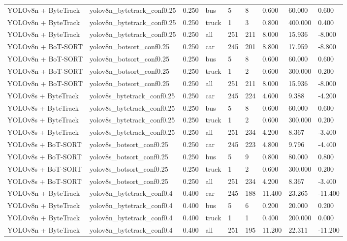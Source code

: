\begin{tabular}{lllllllll}
YOLOv8n + ByteTrack & yolov8n\_bytetrack\_conf0.25 & 0.250 & bus & 5 & 8 & 0.600 & 60.000 & 0.600 \\
YOLOv8n + ByteTrack & yolov8n\_bytetrack\_conf0.25 & 0.250 & truck & 1 & 3 & 0.800 & 400.000 & 0.400 \\
YOLOv8n + ByteTrack & yolov8n\_bytetrack\_conf0.25 & 0.250 & all & 251 & 211 & 8.000 & 15.936 & -8.000 \\
YOLOv8n + BoT-SORT & yolov8n\_botsort\_conf0.25 & 0.250 & car & 245 & 201 & 8.800 & 17.959 & -8.800 \\
YOLOv8n + BoT-SORT & yolov8n\_botsort\_conf0.25 & 0.250 & bus & 5 & 8 & 0.600 & 60.000 & 0.600 \\
YOLOv8n + BoT-SORT & yolov8n\_botsort\_conf0.25 & 0.250 & truck & 1 & 2 & 0.600 & 300.000 & 0.200 \\
YOLOv8n + BoT-SORT & yolov8n\_botsort\_conf0.25 & 0.250 & all & 251 & 211 & 8.000 & 15.936 & -8.000 \\
YOLOv8s + ByteTrack & yolov8s\_bytetrack\_conf0.25 & 0.250 & car & 245 & 224 & 4.600 & 9.388 & -4.200 \\
YOLOv8s + ByteTrack & yolov8s\_bytetrack\_conf0.25 & 0.250 & bus & 5 & 8 & 0.600 & 60.000 & 0.600 \\
YOLOv8s + ByteTrack & yolov8s\_bytetrack\_conf0.25 & 0.250 & truck & 1 & 2 & 0.600 & 300.000 & 0.200 \\
YOLOv8s + ByteTrack & yolov8s\_bytetrack\_conf0.25 & 0.250 & all & 251 & 234 & 4.200 & 8.367 & -3.400 \\
YOLOv8s + BoT-SORT & yolov8s\_botsort\_conf0.25 & 0.250 & car & 245 & 223 & 4.800 & 9.796 & -4.400 \\
YOLOv8s + BoT-SORT & yolov8s\_botsort\_conf0.25 & 0.250 & bus & 5 & 9 & 0.800 & 80.000 & 0.800 \\
YOLOv8s + BoT-SORT & yolov8s\_botsort\_conf0.25 & 0.250 & truck & 1 & 2 & 0.600 & 300.000 & 0.200 \\
YOLOv8s + BoT-SORT & yolov8s\_botsort\_conf0.25 & 0.250 & all & 251 & 234 & 4.200 & 8.367 & -3.400 \\
YOLOv8n + ByteTrack & yolov8n\_bytetrack\_conf0.4 & 0.400 & car & 245 & 188 & 11.400 & 23.265 & -11.400 \\
YOLOv8n + ByteTrack & yolov8n\_bytetrack\_conf0.4 & 0.400 & bus & 5 & 6 & 0.200 & 20.000 & 0.200 \\
YOLOv8n + ByteTrack & yolov8n\_bytetrack\_conf0.4 & 0.400 & truck & 1 & 1 & 0.400 & 200.000 & 0.000 \\
YOLOv8n + ByteTrack & yolov8n\_bytetrack\_conf0.4 & 0.400 & all & 251 & 195 & 11.200 & 22.311 & -11.200 \\

\end{tabular}

